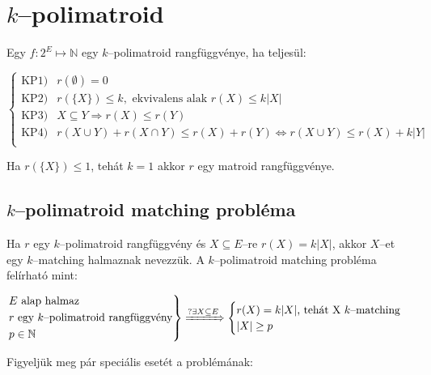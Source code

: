 \skiptooddpage%
\section{\texorpdfstring{$k$--polimatroid}
  {k--polimatroid}}

Egy  $f:2^E \mapsto \mathbb{N}$ egy $k$--polimatroid rangfüggvénye, ha teljesül:

\[
	\begin{cases}
		\mbox{KP1}) & r(\emptyset)=0                                                                           \\
		\mbox{KP2}) & r(\{X\}) \leq k, \mbox{ ekvivalens alak } r(X) \leq k |X|                                \\
		\mbox{KP3}) & X \subseteq Y \Rightarrow r(X) \leq r(Y)                                                 \\
		\mbox{KP4}) & r(X \cup Y) + r (X \cap Y) \leq r(X) + r(Y) \Leftrightarrow r(X \cup Y) \leq r(X) + k|Y| \\
	\end{cases}
\]

Ha $r(\{X\}) \leq 1$, tehát $k=1$ akkor $r$ egy matroid rangfüggvénye.

\subsection{\texorpdfstring{$k$--polimatroid matching probléma}
	{k--polimatroid matching probléma}}


Ha $r$ egy $k$--polimatroid rangfüggvény és $X\subseteq E$--re $r(X)=k|X|$,
akkor $X$--et egy $k$--matching halmaznak nevezzük. A $k$--polimatroid matching
probléma felírható mint:

\[
	\begin{rcases}
		E \mbox{ alap halmaz}                              \\
		r \mbox{ egy } k \mbox{--polimatroid rangfüggvény} \\
		p \in \mathbb{N}                                   \\
	\end{rcases}  \xRightarrow {?\exists X \subseteq E}
	\begin{cases}
		r(X)=k|X| \mbox{, tehát X } k \mbox{--matching} \\
		|X| \geq p
	\end{cases}
\]

Figyeljük meg pár speciális esetét a problémának:

